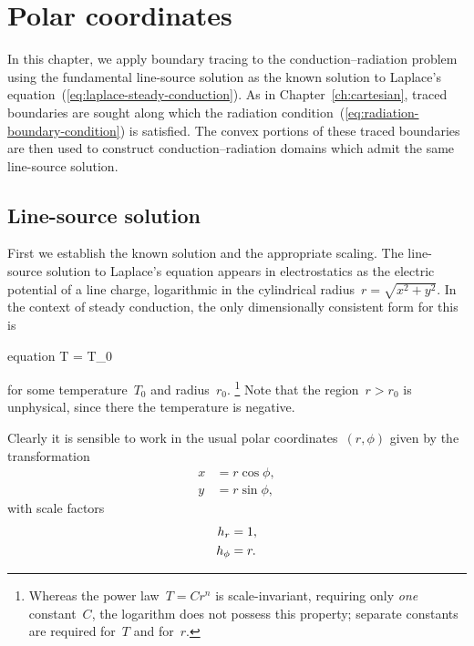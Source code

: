 \chapter{Polar coordinates}
\label{ch:polar}

In this chapter,
we apply boundary tracing to the conduction--radiation problem
using the fundamental line-source solution
as the known solution to
Laplace's equation~(\ref{eq:laplace-steady-conduction}).
As in Chapter~\ref{ch:cartesian},
traced boundaries are sought along which
the radiation condition~(\ref{eq:radiation-boundary-condition})
is satisfied.
The convex portions of these traced boundaries are then used
to construct conduction--radiation domains
which admit the same line-source solution.

\section{Line-source solution}
\label{sec:polar.line}

First we establish the known solution and the appropriate scaling.
The line-source solution
to Laplace's equation
appears in electrostatics
as the electric potential of a line charge,
logarithmic in the cylindrical radius~$r = \sqrt{x^2 + y^2}$.
In the context of steady conduction,
the only dimensionally consistent form for this is
\begin{important}{equation}
  T = T_0 \log {}
  \label{eq:line-laplace-solution}
\end{important}
for some temperature~$T_0$ and radius~$r_0$.%
\footnote{
  Whereas the power law~$T = C r^n$ is scale-invariant,
  requiring only \emph{one} constant~$C$,
  the logarithm does not possess this property;
  separate constants are required for~$T$ and for~$r$.
}
Note that the region~$r > r_0$ is unphysical,
since there the temperature is negative.

Clearly it is sensible to work in the usual polar coordinates~$(r, \phi)$
given by the transformation
\begin{align}
  x &= r \cos\phi, \label{eq:x-transformation-polar} \\
  y &= r \sin\phi, \label{eq:y-transformation-polar}
\end{align}
with scale factors
\begin{align}
  \scalefac[r] &= 1, \label{eq:r-scale-factor-polar} \\
  \scalefac[\phi] &= r. \label{eq:phi-scale-factor-polar}
\end{align}

